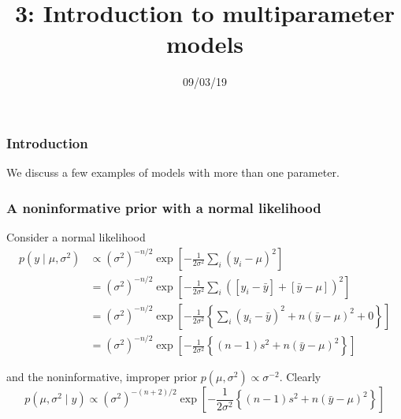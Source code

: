 \documentclass{beamer}
\title["3"]{3: Introduction to multiparameter models}
\date{09/03/19}
\begin{document}

\begin{frame}
\titlepage 
\end{frame}

\begin{frame}
\frametitle{Introduction}

We discuss a few examples of models with more than one parameter.


\end{frame}


\begin{frame}
\frametitle{A noninformative prior with a normal likelihood}

Consider a normal likelihood
\begin{align*}
p(y \mid \mu, \sigma^2) &\propto (\sigma^2)^{-n/2}\exp\left[ - \frac{1}{2\sigma^2} \sum_i(y_i- \mu)^2 \right] \\
&= (\sigma^2)^{-n/2}\exp\left[ - \frac{1}{2\sigma^2} \sum_i([y_i- \bar{y}] + [\bar{y} - \mu])^2 \right] \\
&= (\sigma^2)^{-n/2}\exp\left[ - \frac{1}{2\sigma^2} \left\{ \sum_i(y_i- \bar{y})^2 + n(\bar{y} - \mu)^2 + 0 \right\} \right] \\
&= (\sigma^2)^{-n/2} \exp\left[ - \frac{1}{2\sigma^2}\left\{(n-1)  s^2 + n(\bar{y} - \mu)^2 \right\} \right]
\end{align*}

and the noninformative, improper prior $p(\mu, \sigma^2) \propto \sigma^{-2}$. Clearly 
\[
p(\mu, \sigma^2 \mid y) \propto (\sigma^2)^{-(n+2)/2}\exp\left[ - \frac{1}{2\sigma^2}\left\{(n-1)  s^2 + n(\bar{y} - \mu)^2 \right\} \right]
\]

\end{frame}
\end{document}
